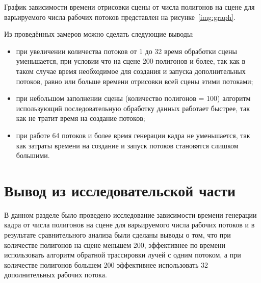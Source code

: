 График зависимости времени отрисовки сцены от числа полигонов на сцене для варьируемого числа рабочих потоков представлен на рисунке~\ref{img:graph}.

\FloatBarrier
{}
\FloatBarrier

Из проведённых замеров можно сделать следующие выводы:
\begin{itemize}
	\item {при увеличении количества потоков от 1 до 32 время обработки сцены уменьшается, при условии что на сцене 200 полигонов и более, так как в таком случае время необходимое для создания и запуска дополнительных потоков, равно или больше времени отрисовки всей сцены этими потоками;}
	\item {при небольшом заполнении сцены (количество полигонов = 100) алгоритм использующий последовательную обработку данных работает быстрее, так как не тратит время на создание потоков;}
	\item {при работе 64 потоков и более время генерации кадра не уменьшается, так как затраты времени на создание и запуск потоков становятся слишком большими.}
\end{itemize}


\section{Вывод из исследовательской части}
В данном разделе было проведено исследование зависимости времени генерации кадра от числа полигонов на сцене для варьируемого числа рабочих потоков и в результате сравнительного анализа были сделаны выводы о том, что при количестве полигонов на сцене меньшем 200, эффективнее по времени использовать алгоритм обратной трассировки лучей с одним потоком, а при  количестве полигонов большем 200 эффективнее использовать 32 дополнительных рабочих потока.


\clearpage
